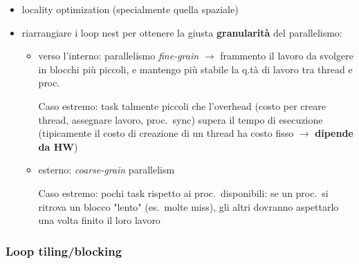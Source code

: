 \begin{itemize}
  \item locality optimization (specialmente quella spaziale)
  \item riarrangiare i loop nest per ottenere la giusta \textbf{granularit\`a} del parallelismo:
    \begin{itemize}
      \item verso l'interno: parallelismo \textit{fine-grain} $\rightarrow$ frammento il lavoro da svolgere in blocchi pi\`u piccoli, e mantengo pi\`u stabile la q.t\`a di lavoro tra thread e proc.
      \begin{emphasize}
          Caso estremo: task talmente piccoli che l'overhead (costo per creare thread, assegnare lavoro, proc.~sync) supera il tempo di esecuzione (tipicamente il costo di creazione di un thread ha costo fisso $\rightarrow$ \textbf{dipende da HW})
      \end{emphasize}
      \item esterno: \textit{coarse-grain} parallelism
        \begin{emphasize}
        Caso estremo: pochi task rispetto ai proc.~disponibili: se un proc.~si ritrova un blocco "lento" (es.~molte miss), gli altri dovranno aspettarlo una volta finito il loro lavoro
        \end{emphasize}
    \end{itemize}
\end{itemize}

\subsubsection{Loop tiling/blocking}

